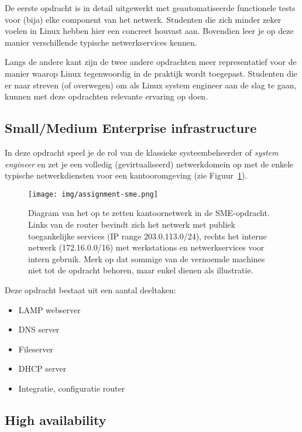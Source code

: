 De eerste opdracht is in detail uitgewerkt met geautomatiseerde functionele tests voor (bija) elke component van het netwerk. Studenten die zich minder zeker voelen in Linux hebben hier een concreet houvast aan. Bovendien leer je op deze manier verschillende typische netwerkservices kennen.

Langs de andere kant zijn de twee andere opdrachten meer representatief voor de manier waarop Linux tegenwoordig in de praktijk wordt toegepast. Studenten die er naar streven (of overwegen) om als Linux system engineer aan de slag te gaan, kunnen met deze opdrachten relevante ervaring op doen.

\subsection{Small/Medium Enterprise infrastructure}%
\label{subs:smallmedium-enterprise-infrastructure}

In deze opdracht speel je de rol van de klassieke systeembeheerder of \textit{system engineer} en zet je een volledig (gevirtualiseerd) netwerkdomein op met de enkele typische netwerkdiensten voor een kantooromgeving (zie Figuur~\ref{fig:sme}).

\begin{figure}
  \centering
  \texttt{[image: img/assignment-sme.png]}
  \caption[Netwerkdiagram SME-opdracht]{Diagram van het op te zetten kantoornetwerk in de SME-opdracht. Links van de router bevindt zich het netwerk met publiek toegankelijke services (IP range 203.0.113.0/24), rechts het interne netwerk (172.16.0.0/16) met werkstations en netwerkservices voor intern gebruik. Merk op dat sommige van de vernoemde machines niet tot de opdracht behoren, maar enkel dienen als illustratie.}%
  \label{fig:sme}
\end{figure}

Deze opdracht bestaat uit een aantal deeltaken:

\begin{itemize}
\item LAMP webserver
\item DNS server
\item Fileserver
\item DHCP server
\item Integratie, configuratie router
\end{itemize}

\subsection{High availability}%
\label{subs:high-availability}

